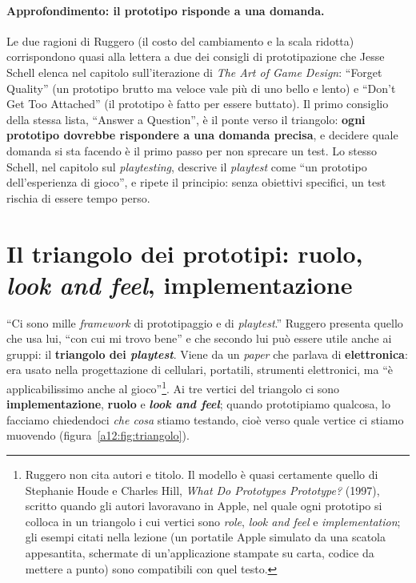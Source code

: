\paragraph{Approfondimento: il prototipo risponde a una domanda.} Le due ragioni di
Ruggero (il costo del cambiamento e la scala ridotta) corrispondono quasi alla lettera a
due dei consigli di prototipazione che Jesse Schell elenca nel capitolo
sull'iterazione di \emph{The Art of Game Design}: ``Forget Quality'' (un prototipo
brutto ma veloce vale più di uno bello e lento) e ``Don't Get Too Attached'' (il
prototipo è fatto per essere buttato). Il primo consiglio della stessa lista,
``Answer a Question'', è il ponte verso il triangolo: \textbf{ogni prototipo dovrebbe
rispondere a una domanda precisa}, e decidere quale domanda si sta facendo è il primo
passo per non sprecare un test. Lo stesso Schell, nel capitolo sul
\emph{playtesting}, descrive il \emph{playtest} come ``un prototipo dell'esperienza di
gioco'', e ripete il principio: senza obiettivi specifici, un test rischia di essere tempo
perso.

\section{Il triangolo dei prototipi: ruolo, \emph{look and feel}, implementazione}
\label{a12:sec:triangolo}



``Ci sono mille \emph{framework} di prototipaggio e di \emph{playtest}.'' Ruggero
presenta quello che usa lui, ``con cui mi trovo bene'' e che secondo lui può essere
utile anche ai gruppi: il \textbf{triangolo dei \emph{playtest}}. Viene da un
\emph{paper} che parlava di \textbf{elettronica}: era usato nella progettazione di
cellulari, portatili, strumenti elettronici, ma ``è applicabilissimo anche al
gioco''\footnote{Ruggero non cita autori e titolo. Il modello è quasi certamente quello
di Stephanie Houde e Charles Hill, \emph{What Do Prototypes Prototype?} (1997), scritto
quando gli autori lavoravano in Apple, nel quale ogni prototipo si colloca in un
triangolo i cui vertici sono \emph{role}, \emph{look and feel} e
\emph{implementation}; gli esempi citati nella lezione (un portatile Apple simulato da
una scatola appesantita, schermate di un'applicazione stampate su carta, codice da
mettere a punto) sono compatibili con quel testo.}. Ai tre vertici del triangolo ci sono
\textbf{implementazione}, \textbf{ruolo} e \textbf{\emph{look and feel}}; quando
prototipiamo qualcosa, lo facciamo chiedendoci \emph{che cosa} stiamo testando, cioè
verso quale vertice ci stiamo muovendo (figura~\ref{a12:fig:triangolo}).

